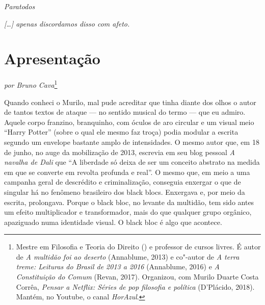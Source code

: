 \pagebreak

\vspace*{\fill}\thispagestyle{empty}
\begin{flushright}
\emph{Paratodos}
\end{flushright}
\pagebreak

\vspace*{\fill}\thispagestyle{empty}
\begin{flushright}
\emph{{[}\ldots{}{]} apenas discordamos disso com afeto.}
\end{flushright}

\chapter*{Apresentação}

\begin{flushright}
\emph{por Bruno Cava}\footnote{Mestre em Filosofia e Teoria do Direito
() e professor de cursos livres. É autor de \emph{A multidão foi
ao deserto} (Annablume, 2013) e co"-autor de \emph{A terra treme: Leituras do
Brasil de 2013 a 2016} (Annablume, 2016) e \emph{A Constituição do Comum} (Revan,
2017). Organizou, com Murilo Duarte Costa Corrêa, \emph{Pensar a Netflix: Séries
de pop filosofia e política} (D’Plácido, 2018). Mantém, no Youtube, o
canal \emph{HorAzul}.}
\end{flushright}

Quando conheci o Murilo, mal pude acreditar que tinha diante
dos olhos o autor de tantos textos de ataque --- no sentido musical do
termo --- que eu admiro. Aquele corpo franzino, branquinho, com óculos de
aro circular e um visual meio ``Harry Potter'' (sobre o qual ele mesmo faz
troça) podia modular a escrita segundo um envelope bastante amplo de
intensidades. O mesmo autor que, em 18 de junho, no auge da
mobilização de 2013, escrevia em seu blog pessoal \emph{A navalha de
Dali} que ``A liberdade só deixa de ser um conceito abstrato na medida em
que se converte em revolta profunda e real''. O mesmo que, em meio a uma
campanha geral de descrédito e criminalização, conseguia enxergar o que
de singular há no fenômeno brasileiro dos black blocs. Enxergava e, por
meio da escrita, prolongava. Porque o black bloc, no levante da
multidão, tem sido antes um efeito multiplicador e transformador, mais do que
qualquer grupo orgânico, apaziguado numa identidade visual. O black bloc
é algo que acontece.

